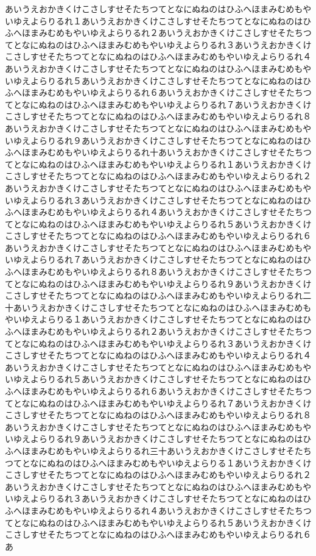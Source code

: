 \documentclass[uplatex,dvipdfmx,11pt]{jsbook}
\begin{document}
      あいうえおかきくけこさしすせそたちつてとなにぬねのはひふへほまみむめもやいゆえよらりるれ１あいうえおかきくけこさしすせそたちつてとなにぬねのはひふへほまみむめもやいゆえよらりるれ２あいうえおかきくけこさしすせそたちつてとなにぬねのはひふへほまみむめもやいゆえよらりるれ３あいうえおかきくけこさしすせそたちつてとなにぬねのはひふへほまみむめもやいゆえよらりるれ４あいうえおかきくけこさしすせそたちつてとなにぬねのはひふへほまみむめもやいゆえよらりるれ５あいうえおかきくけこさしすせそたちつてとなにぬねのはひふへほまみむめもやいゆえよらりるれ６あいうえおかきくけこさしすせそたちつてとなにぬねのはひふへほまみむめもやいゆえよらりるれ７あいうえおかきくけこさしすせそたちつてとなにぬねのはひふへほまみむめもやいゆえよらりるれ８あいうえおかきくけこさしすせそたちつてとなにぬねのはひふへほまみむめもやいゆえよらりるれ９あいうえおかきくけこさしすせそたちつてとなにぬねのはひふへほまみむめもやいゆえよらりるれ十あいうえおかきくけこさしすせそたちつてとなにぬねのはひふへほまみむめもやいゆえよらりるれ１あいうえおかきくけこさしすせそたちつてとなにぬねのはひふへほまみむめもやいゆえよらりるれ２あいうえおかきくけこさしすせそたちつてとなにぬねのはひふへほまみむめもやいゆえよらりるれ３あいうえおかきくけこさしすせそたちつてとなにぬねのはひふへほまみむめもやいゆえよらりるれ４あいうえおかきくけこさしすせそたちつてとなにぬねのはひふへほまみむめもやいゆえよらりるれ５あいうえおかきくけこさしすせそたちつてとなにぬねのはひふへほまみむめもやいゆえよらりるれ６あいうえおかきくけこさしすせそたちつてとなにぬねのはひふへほまみむめもやいゆえよらりるれ７あいうえおかきくけこさしすせそたちつてとなにぬねのはひふへほまみむめもやいゆえよらりるれ８あいうえおかきくけこさしすせそたちつてとなにぬねのはひふへほまみむめもやいゆえよらりるれ９あいうえおかきくけこさしすせそたちつてとなにぬねのはひふへほまみむめもやいゆえよらりるれ二十あいうえおかきくけこさしすせそたちつてとなにぬねのはひふへほまみむめもやいゆえよらりる１あいうえおかきくけこさしすせそたちつてとなにぬねのはひふへほまみむめもやいゆえよらりるれ２あいうえおかきくけこさしすせそたちつてとなにぬねのはひふへほまみむめもやいゆえよらりるれ３あいうえおかきくけこさしすせそたちつてとなにぬねのはひふへほまみむめもやいゆえよらりるれ４あいうえおかきくけこさしすせそたちつてとなにぬねのはひふへほまみむめもやいゆえよらりるれ５あいうえおかきくけこさしすせそたちつてとなにぬねのはひふへほまみむめもやいゆえよらりるれ６あいうえおかきくけこさしすせそたちつてとなにぬねのはひふへほまみむめもやいゆえよらりるれ７あいうえおかきくけこさしすせそたちつてとなにぬねのはひふへほまみむめもやいゆえよらりるれ８あいうえおかきくけこさしすせそたちつてとなにぬねのはひふへほまみむめもやいゆえよらりるれ９あいうえおかきくけこさしすせそたちつてとなにぬねのはひふへほまみむめもやいゆえよらりるれ三十あいうえおかきくけこさしすせそたちつてとなにぬねのはひふへほまみむめもやいゆえよらりる１あいうえおかきくけこさしすせそたちつてとなにぬねのはひふへほまみむめもやいゆえよらりるれ２あいうえおかきくけこさしすせそたちつてとなにぬねのはひふへほまみむめもやいゆえよらりるれ３あいうえおかきくけこさしすせそたちつてとなにぬねのはひふへほまみむめもやいゆえよらりるれ４あいうえおかきくけこさしすせそたちつてとなにぬねのはひふへほまみむめもやいゆえよらりるれ５あいうえおかきくけこさしすせそたちつてとなにぬねのはひふへほまみむめもやいゆえよらりるれ６あ
\end{document}
